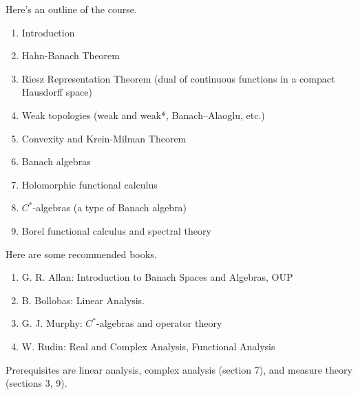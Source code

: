 Here's an outline of the course.
\begin{enumerate}
\item
Introduction
\item
Hahn-Banach Theorem
\item
Riesz Representation Theorem (dual of continuous functions in a compact Hausdorff space)
\item
Weak topologies (weak and weak*, Banach--Alaoglu, etc.)
\item
Convexity and Krein-Milman Theorem
\item
Banach algebras
\item
Holomorphic functional calculus
\item
$C^*$-algebras (a type of Banach algebra)
\item
Borel functional calculus and spectral theory
\end{enumerate}
Here are some recommended books.
\begin{enumerate}
\item
G. R. Allan: Introduction to Banach Spaces and Algebras, OUP
\item
B. Bollobas: Linear Analysis.
\item
G. J. Murphy: $C^*$-algebras and operator theory
\item
W. Rudin: Real and Complex Analysis, Functional Analysis
\end{enumerate}
Prerequisites are linear analysis, complex analysis (section 7), and measure theory (sections 3, 9).











\appendix









\printnomenclature
\printindex
